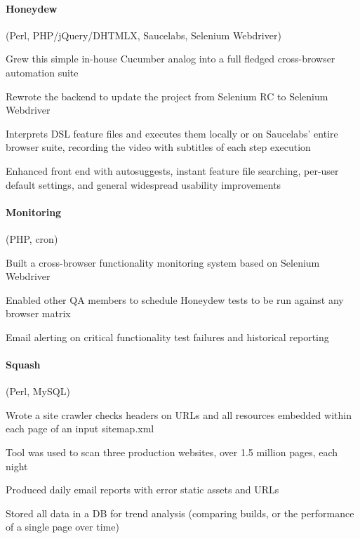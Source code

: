 \begin{position}

  \paragraph{Honeydew} (Perl, PHP/jQuery/DHTMLX, Saucelabs, Selenium Webdriver)
  \begin{myitem}
  \item Grew this simple in-house Cucumber analog into a full fledged cross-browser automation suite
  \item Rewrote the backend to update the project from Selenium RC to Selenium Webdriver
  \item Interprets DSL feature files and executes them locally or on Saucelabs' entire browser suite, recording
    the video with subtitles of each step execution
  \item Enhanced front end with autosuggests, instant feature file searching, per-user default
    settings, and general widespread usability improvements
  \end{myitem}

  \paragraph{Monitoring} (PHP, cron)
  \begin{myitem}
  \item Built a cross-browser functionality monitoring system based on Selenium Webdriver
  \item Enabled other QA members to schedule Honeydew tests to be run against any browser matrix
  \item Email alerting on critical functionality test failures and historical reporting
  \end{myitem}

  \paragraph{Squash} (Perl, MySQL)
  \begin{myitem}
  \item Wrote a site crawler checks headers on URLs and all resources embedded within each page of an
    input sitemap.xml
  \item Tool was used to scan three production websites, over 1.5 million pages, each night
  \item Produced daily email reports with error static assets and URLs
  \item Stored all data in a DB for trend analysis (comparing builds, or the performance of a single
    page over time)
  \end{myitem}


\end{position}
